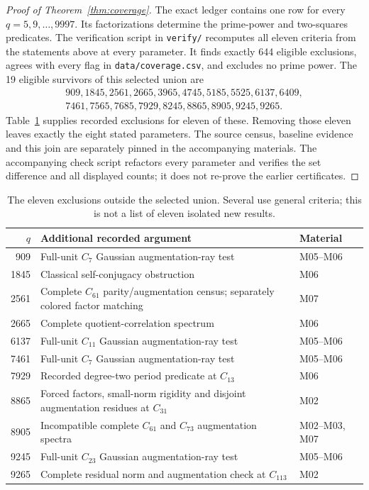 \documentclass[11pt]{article}
\theoremstyle{definition}
\theoremstyle{remark}
\begin{document}
\begin{proof}[Proof of Theorem~\ref{thm:coverage}]
The exact ledger contains one row for every $q=5,9,\ldots,9997$.
Its factorizations determine the prime-power and two-squares predicates.
The verification script in \texttt{verify/} recomputes all eleven
criteria from the statements above at every parameter. It finds exactly
644 eligible exclusions, agrees with every flag in
\texttt{data/coverage.csv}, and excludes no prime power. The 19 eligible survivors of this selected union are
\[
\begin{gathered}
909,1845,2561,2665,3965,4745,5185,5525,6137,6409,\\
7461,7565,7685,7929,8245,8865,8905,9245,9265.
\end{gathered}
\]
Table~\ref{tab:additional} supplies recorded exclusions for eleven of
these. Removing those eleven leaves exactly the eight stated parameters.
The source census, baseline evidence and this join are separately pinned
in the accompanying materials. The accompanying check script
refactors every parameter and verifies the set difference and all displayed
counts; it does not re-prove the earlier certificates.
\end{proof}

\begin{table}[ht]
\centering\small
\begin{tabular}{rp{}l}
\toprule
$q$ & Additional recorded argument & Material\\
\midrule
909 & Full-unit $C_7$ Gaussian augmentation-ray test &M05--M06\\
1845 & Classical self-conjugacy obstruction &M06\\
2561 & Complete $C_{61}$ parity/augmentation census; separately colored factor matching &M07\\
2665 & Complete quotient-correlation spectrum &M06\\
6137 & Full-unit $C_{11}$ Gaussian augmentation-ray test &M05--M06\\
7461 & Full-unit $C_7$ Gaussian augmentation-ray test &M05--M06\\
7929 & Recorded degree-two period predicate at $C_{13}$ &M06\\
8865 & Forced factors, small-norm rigidity and disjoint augmentation residues at $C_{31}$ &M02\\
8905 & Incompatible complete $C_{61}$ and $C_{73}$ augmentation spectra &M02--M03, M07\\
9245 & Full-unit $C_{23}$ Gaussian augmentation-ray test &M05--M06\\
9265 & Complete residual norm and augmentation check at $C_{113}$ &M02\\
\bottomrule
\end{tabular}
\caption{The eleven exclusions outside the selected union. Several use
general criteria; this is not a list of eleven isolated new results.}
\label{tab:additional}
\end{table}
\end{document}
